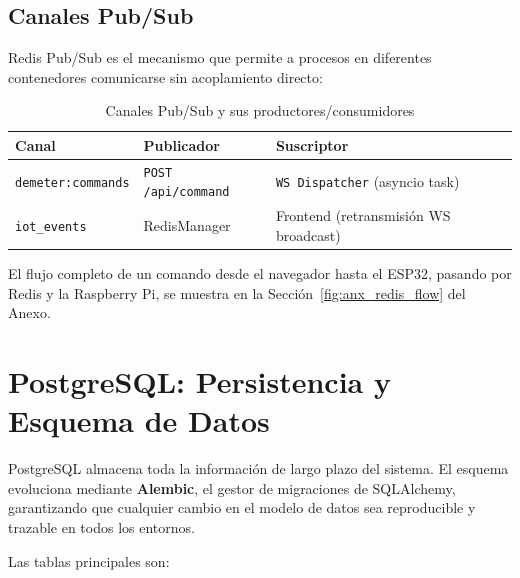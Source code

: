 \subsection{Canales Pub/Sub}

Redis Pub/Sub es el mecanismo que permite a procesos en diferentes contenedores comunicarse 
sin acoplamiento directo:

\begin{table}[H]
    \centering
    \caption{Canales Pub/Sub y sus productores/consumidores}
    \begin{tabular}{lll}
        \toprule
        \textbf{Canal} & \textbf{Publicador} & \textbf{Suscriptor} \\
        \midrule
        \texttt{demeter:commands} & \texttt{POST /api/command} & \texttt{WS Dispatcher} (asyncio task) \\
        \texttt{iot\_events}      & RedisManager               & Frontend (retransmisión WS broadcast) \\
        \bottomrule
    \end{tabular}
\end{table}

El flujo completo de un comando desde el navegador hasta el ESP32, pasando por Redis y la 
Raspberry Pi, se muestra en la Sección~\ref{fig:anx_redis_flow} del Anexo.


\section{PostgreSQL: Persistencia y Esquema de Datos}

PostgreSQL almacena toda la información de largo plazo del sistema. El esquema evoluciona 
mediante \textbf{Alembic}, el gestor de migraciones de SQLAlchemy, garantizando que cualquier 
cambio en el modelo de datos sea reproducible y trazable en todos los entornos.

Las tablas principales son:

